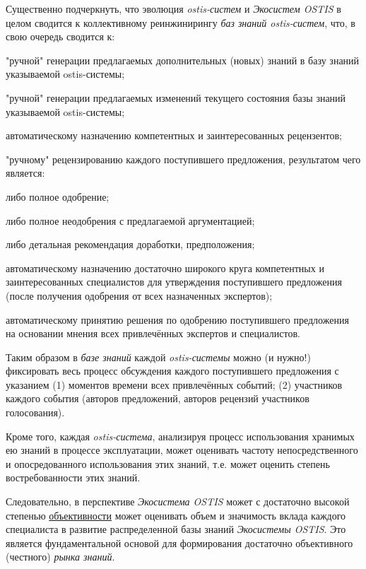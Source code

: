 {Существенно подчеркнуть, что эволюция \textit{ostis-систем} и \textit{Экосистем OSTIS} в целом сводится к коллективному реинжинирингу \textit{баз знаний ostis-систем}, что, в свою очередь сводится к:
	\begin{scnitemize}
	\item "ручной"{} генерации предлагаемых дополнительных (новых) знаний в базу знаний указываемой \mbox{ostis-системы};
	\item "ручной"{} генерации предлагаемых изменений текущего состояния
базы знаний указываемой ostis-системы;
	\item автоматическому назначению компетентных и заинтересованных
рецензентов;
	\item "ручному"{} рецензированию каждого поступившего предложения,
результатом чего является:
		\begin{scnitemizeii}
		\item либо полное одобрение;
		\item либо полное неодобрения с предлагаемой аргументацией;		
		\item либо детальная рекомендация доработки, предположения;		
		\end{scnitemizeii}
	\item автоматическому назначению достаточно широкого круга компетентных и заинтересованных специалистов для утверждения
поступившего предложения (после получения одобрения от всех назначенных экспертов);
	\item автоматическому принятию решения по одобрению поступившего
предложения на основании мнения всех привлечённых экспертов и
специалистов.
	\end{scnitemize}

Таким образом в \textit{базе знаний} каждой \textit{ostis-системы} можно (и нужно!)
фиксировать весь процесс обсуждения каждого поступившего предложения с
указанием (1) моментов времени всех привлечённых событий; (2) участников каждого события (авторов предложений, авторов рецензий участников голосования).

Кроме того, каждая \textit{ostis-система}, анализируя процесс использования
хранимых ею знаний в процессе эксплуатации, может оценивать частоту
непосредственного и опосредованного использования этих знаний, т.е. может оценить степень востребованности этих знаний.	

Следовательно, в перспективе \textit{Экосистема OSTIS} может с достаточно
высокой степенью \uline{объективности} может оценивать объем и значимость вклада каждого специалиста в развитие распределенной базы знаний \textit{Экосистемы OSTIS}. Это является фундаментальной основой для
формирования достаточно объективного (честного) \textit{рынка знаний}.}

